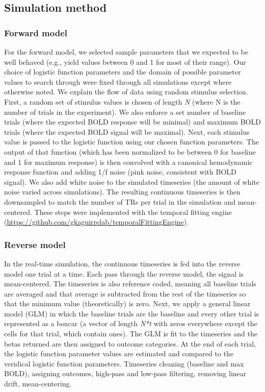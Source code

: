 \documentclass[
  man,floatsintext]{apa6}
\begin{document}
\hypertarget{simulation-method}{%
\subsection{Simulation method}\label{simulation-method}}

\hypertarget{forward-model}{%
\subsubsection{Forward model}\label{forward-model}}

For the forward model, we selected sample parameters that we expected to be well behaved (e.g., yield values between 0 and 1 for most of their range). Our choice of logistic function parameters and the domain of possible parameter values to search through were fixed through all simulations except where otherwise noted.
We explain the flow of data using random stimulus selection. First, a random set of stimulus values is chosen of length \emph{N} (where N is the number of trials in the experiment). We also enforce a set number of baseline trials (where the expected BOLD response will be minimal) and maximum BOLD trials (where the expected BOLD signal will be maximal). Next, each stimulus value is passed to the logistic function using our chosen function parameters. The output of that function (which has been normalized to be between 0 for baseline and 1 for maximum response) is then convolved with a canonical hemodynamic response function and adding 1/f noise (pink noise, consistent with BOLD signal). We also add white noise to the simulated timeseries (the amount of white noise varied across simulations). The resulting continuous timeseries is then downsampled to match the number of TRs per trial in the simulation and mean-centered. These steps were implemented with the temporal fitting engine (\url{https://github.com/gkaguirrelab/temporalFittingEngine}).

\hypertarget{reverse-model}{%
\subsubsection{Reverse model}\label{reverse-model}}

In the real-time simulation, the continuous timeseries is fed into the reverse model one trial at a time. Each pass through the reverse model, the signal is mean-centered. The timeseries is also reference coded, meaning all baseline trials are averaged and that average is subtracted from the rest of the timeseries so that the minimum value (theoretically) is zero. Next, we apply a general linear model (GLM) in which the baseline trials are the baseline and every other trial is represented as a boxcar (a vector of length \emph{N*t} with zeros everywhere except the cells for that trial, which contain ones). The GLM is fit to the timeseries and the betas returned are then assigned to outcome categories. At the end of each trial, the logistic function parameter values are estimated and compared to the veridical logistic function parameters.
Timeseries cleaning (baseline and max BOLD), assigning outcomes, high-pass and low-pass filtering, removing linear drift, mean-centering.
\end{document}
